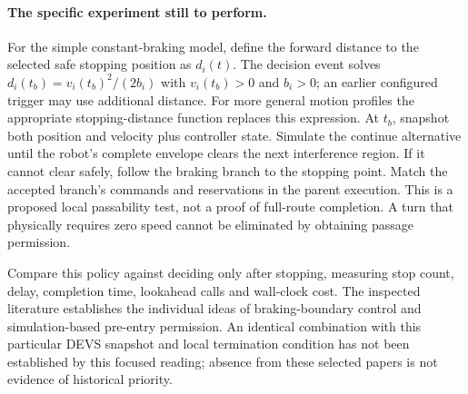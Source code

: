 \documentclass[11pt,a4paper]{article}
\theoremstyle{remark}
\begin{document}
\paragraph{The specific experiment still to perform.}
For the simple constant-braking model, define the forward distance to the
selected safe stopping position as $d_i(t)$. The decision event solves
$d_i(t_b)=v_i(t_b)^2/(2b_i)$ with $v_i(t_b)>0$ and $b_i>0$; an earlier
configured trigger may use additional distance. For more general motion
profiles the appropriate stopping-distance function replaces this expression.
At $t_b$, snapshot both position and velocity plus controller state. Simulate
the continue alternative until the robot's complete envelope clears the next
interference region. If it cannot clear safely, follow the braking branch
to the stopping point. Match the accepted branch's commands and reservations
in the parent execution. This is a proposed local passability test, not a
proof of full-route completion. A turn that physically requires zero speed
cannot be eliminated by obtaining passage permission.

Compare this policy against deciding only after stopping, measuring stop
count, delay, completion time, lookahead calls and wall-clock cost. The
inspected literature establishes the individual ideas of braking-boundary
control and simulation-based pre-entry permission. An identical combination
with this particular DEVS snapshot and local termination condition has not
been established by this focused reading; absence from these selected papers
is not evidence of historical priority.
\end{document}
